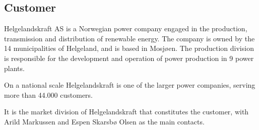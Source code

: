 \subsection{Customer}
Helgelandskraft AS is a Norwegian power company engaged in the production,
transmission and distribution of renewable energy. The company is owned by
the 14 municipalities of Helgeland, and is based in Mosjøen. The production
division is responsible for the development and operation of power production
in 9 power plants.

On a national scale Helgelandskraft is one of the larger power companies,
serving more than 44.000 customers.

It is the market division of Helgelandskraft that constitutes the customer,
with Arild Markussen and Espen Skarsbø Olsen as the main contacts.
